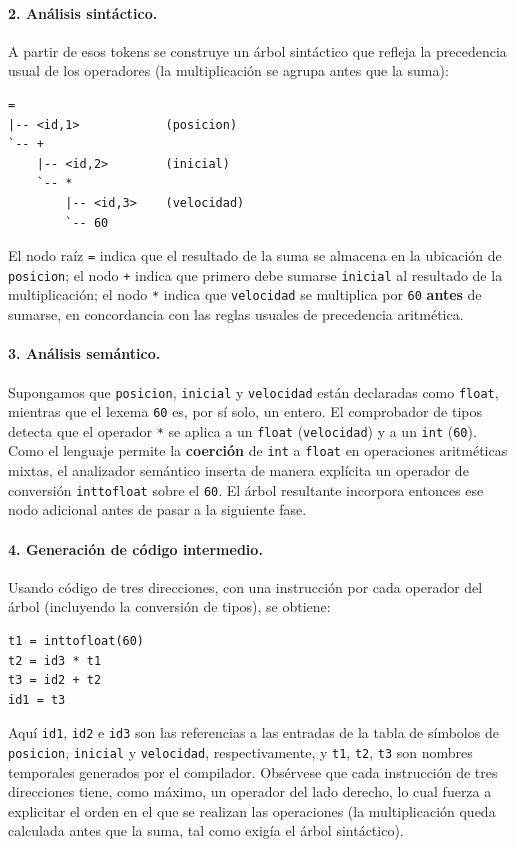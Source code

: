 \documentclass[11pt,a4paper]{article}
\begin{document}
\paragraph{2. Análisis sintáctico.} A partir de esos tokens se construye un árbol sintáctico que
refleja la precedencia usual de los operadores (la multiplicación se agrupa antes que la suma):

\begin{lstlisting}
=
|-- <id,1>            (posicion)
`-- +
    |-- <id,2>        (inicial)
    `-- *
        |-- <id,3>    (velocidad)
        `-- 60
\end{lstlisting}

El nodo raíz \texttt{=} indica que el resultado de la suma se almacena en la ubicación de
\texttt{posicion}; el nodo \texttt{+} indica que primero debe sumarse \texttt{inicial} al
resultado de la multiplicación; el nodo \texttt{*} indica que \texttt{velocidad} se multiplica
por \texttt{60} \textbf{antes} de sumarse, en concordancia con las reglas usuales de precedencia
aritmética.

\paragraph{3. Análisis semántico.} Supongamos que \texttt{posicion}, \texttt{inicial} y
\texttt{velocidad} están declaradas como \texttt{float}, mientras que el lexema \texttt{60} es,
por sí solo, un entero. El comprobador de tipos detecta que el operador \texttt{*} se aplica a
un \texttt{float} (\texttt{velocidad}) y a un \texttt{int} (\texttt{60}). Como el lenguaje
permite la \textbf{coerción} de \texttt{int} a \texttt{float} en operaciones aritméticas
mixtas, el analizador semántico inserta de manera explícita un operador de conversión
\texttt{inttofloat} sobre el \texttt{60}. El árbol resultante incorpora entonces ese nodo
adicional antes de pasar a la siguiente fase.

\paragraph{4. Generación de código intermedio.} Usando código de tres direcciones, con una
instrucción por cada operador del árbol (incluyendo la conversión de tipos), se obtiene:

\begin{lstlisting}
t1 = inttofloat(60)
t2 = id3 * t1
t3 = id2 + t2
id1 = t3
\end{lstlisting}

Aquí \texttt{id1}, \texttt{id2} e \texttt{id3} son las referencias a las entradas de la tabla de
símbolos de \texttt{posicion}, \texttt{inicial} y \texttt{velocidad}, respectivamente, y
\texttt{t1}, \texttt{t2}, \texttt{t3} son nombres temporales generados por el compilador.
Obsérvese que cada instrucción de tres direcciones tiene, como máximo, un operador del lado
derecho, lo cual fuerza a explicitar el orden en el que se realizan las operaciones (la
multiplicación queda calculada antes que la suma, tal como exigía el árbol sintáctico).
\end{document}
